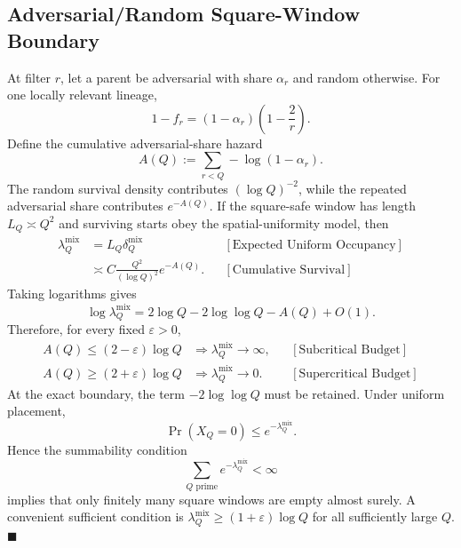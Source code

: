 \subsection{Adversarial/Random Square-Window Boundary}
At filter $r$, let a parent be adversarial with share $\alpha_r$ and random otherwise. For one locally relevant lineage,
\begin{equation*}
1-f_r
=(1-\alpha_r)\left(1-\frac2r\right).
\end{equation*}
Define the cumulative adversarial-share hazard
\begin{equation*}
A(Q):=\sum_{r < Q}-\log(1-\alpha_r).
\end{equation*}
The random survival density contributes $(\log Q)^{-2}$, while the repeated adversarial share contributes $e^{-A(Q)}$. If the square-safe window has length $L_Q\asymp Q^2$ and surviving starts obey the spatial-uniformity model, then
\begin{equation*}
\begin{aligned}
\lambda_Q^{\mathrm{mix}}
&=L_Q\delta_Q^{\mathrm{mix}}
&&[\text{Expected Uniform Occupancy}]\\
&\asymp
C\frac{Q^2}{(\log Q)^2}e^{-A(Q)}.
&&[\text{Cumulative Survival}]
\end{aligned}
\end{equation*}
Taking logarithms gives
\begin{equation*}
\log\lambda_Q^{\mathrm{mix}}
=2\log Q-2\log\log Q-A(Q)+O(1).
\end{equation*}
Therefore, for every fixed $\varepsilon>0$,
\begin{equation*}
\begin{aligned}
A(Q)\le(2-\varepsilon)\log Q
&\Longrightarrow
\lambda_Q^{\mathrm{mix}}\longrightarrow\infty,
&&[\text{Subcritical Budget}]\\
A(Q)\ge(2+\varepsilon)\log Q
&\Longrightarrow
\lambda_Q^{\mathrm{mix}}\longrightarrow0.
&&[\text{Supercritical Budget}]
\end{aligned}
\end{equation*}
At the exact boundary, the term $-2\log\log Q$ must be retained. Under uniform placement,
\begin{equation*}
\Pr(X_Q=0)\le e^{-\lambda_Q^{\mathrm{mix}}}.
\end{equation*}
Hence the summability condition
\begin{equation*}
\sum_{Q\text{ prime}}e^{-\lambda_Q^{\mathrm{mix}}}<\infty
\end{equation*}
implies that only finitely many square windows are empty almost surely. A convenient sufficient condition is $\lambda_Q^{\mathrm{mix}}\ge(1+\varepsilon)\log Q$ for all sufficiently large $Q$. $\blacksquare$
